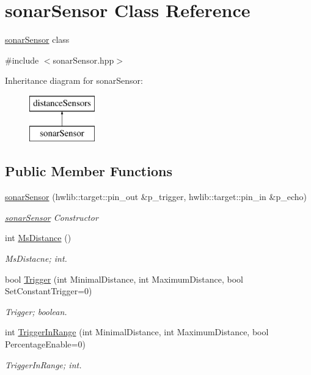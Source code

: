\hypertarget{classsonar_sensor}{}\section{sonar\+Sensor Class Reference}
\label{classsonar_sensor}


\hyperlink{classsonar_sensor}{sonar\+Sensor} class  




{\ttfamily \#include $<$sonar\+Sensor.\+hpp$>$}

Inheritance diagram for sonar\+Sensor\+:\begin{figure}[H]
\begin{center}
\leavevmode
\includegraphics[height=2.000000cm]{classsonar_sensor}
\end{center}
\end{figure}
\subsection*{Public Member Functions}
\begin{DoxyCompactItemize}
\item 
\hyperlink{classsonar_sensor_a66bd7c088348ffe7b0e27186f5a6cc4e}{sonar\+Sensor} (hwlib\+::target\+::pin\+\_\+out \&p\+\_\+trigger, hwlib\+::target\+::pin\+\_\+in \&p\+\_\+echo)
\begin{DoxyCompactList}\small\item\em \hyperlink{classsonar_sensor}{sonar\+Sensor} Constructor \end{DoxyCompactList}\item 
int \hyperlink{classsonar_sensor_a2f58277f0b54053e8a3da2e43ee29560}{Ms\+Distance} ()
\begin{DoxyCompactList}\small\item\em Ms\+Distacne; int. \end{DoxyCompactList}\item 
bool \hyperlink{classsonar_sensor_a98b71611568b818f62a570c40daf56a5}{Trigger} (int Minimal\+Distance, int Maximum\+Distance, bool Set\+Constant\+Trigger=0)
\begin{DoxyCompactList}\small\item\em Trigger; boolean. \end{DoxyCompactList}\item 
int \hyperlink{classsonar_sensor_ae6bdf6cf320d32c07536ba86f8434d8e}{Trigger\+In\+Range} (int Minimal\+Distance, int Maximum\+Distance, bool Percentage\+Enable=0)
\begin{DoxyCompactList}\small\item\em Trigger\+In\+Range; int. \end{DoxyCompactList}\end{DoxyCompactItemize}

